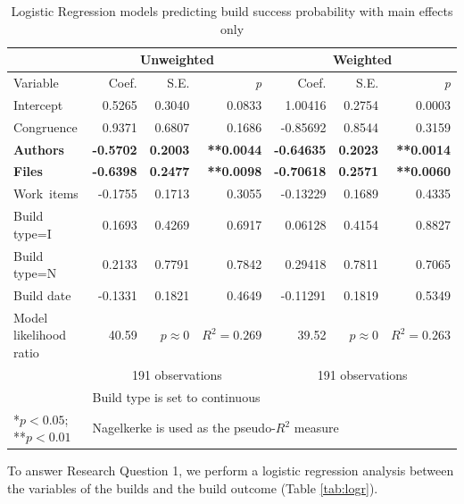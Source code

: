 \documentclass[12pt,oneside]{book}
\begin{document}
\begin{table}
\begin{center}

\begin{tabular}{l|rrr|rrr}
 & \multicolumn{3}{c|}{Unweighted} & \multicolumn{3}{c}{Weighted} \\\hline
Variable & Coef. & S.E. & \emph{p} & Coef. & S.E. & \emph{p} \\
	\hline                                                                
	Intercept                &  0.5265 & 0.3040 & 0.0833 &  1.00416 & 0.2754 & 0.0003 \\
	Congruence               &  0.9371 & 0.6807 & 0.1686 & -0.85692 & 0.8544 & 0.3159 \\
	\textbf{Authors}         & \textbf{-0.5702} & \textbf{0.2003} & \textbf{**0.0044} & \textbf{-0.64635} & \textbf{0.2023} & \textbf{**0.0014} \\
	\textbf{Files}           & \textbf{-0.6398} & \textbf{0.2477} & \textbf{**0.0098} & \textbf{-0.70618} & \textbf{0.2571} & \textbf{**0.0060} \\
	Work~items                & -0.1755 & 0.1713 & 0.3055 & -0.13229 & 0.1689 & 0.4335 \\
	Build type=I                   &  0.1693 & 0.4269 & 0.6917 &  0.06128 & 0.4154 & 0.8827 \\
	Build type=N                   &  0.2133 & 0.7791 & 0.7842 &  0.29418 & 0.7811 & 0.7065 \\
	Build date               & -0.1331 & 0.1821 & 0.4649 & -0.11291 & 0.1819 & 0.5349 \\
	\hline
Model likelihood ratio & 40.59 & $p \approx 0$ & $R^2=0.269$ & 39.52 & $p \approx 0$ &	$R^2 = 0.263$ \\
& \multicolumn{3}{c}{191 observations} & \multicolumn{3}{c}{191 observations} \\
\multicolumn{1}{l}{ } & \multicolumn{6}{l}{\scriptsize{Build type is set to continuous}} \\
\multicolumn{1}{l}{\scriptsize{*$p < 0.05$; **$p < 0.01$}} & \multicolumn{6}{l}{\scriptsize{Nagelkerke is used as the pseudo-$R^2$ measure}}
\end{tabular}


\end{center}
\caption{Logistic Regression models predicting build success probability with main effects only}
\label{tab:logr_maineffects}
\end{table}

To answer Research Question 1, we perform a logistic regression analysis between the variables of the builds and the build outcome (Table \ref{tab:logr}).
\end{document}

